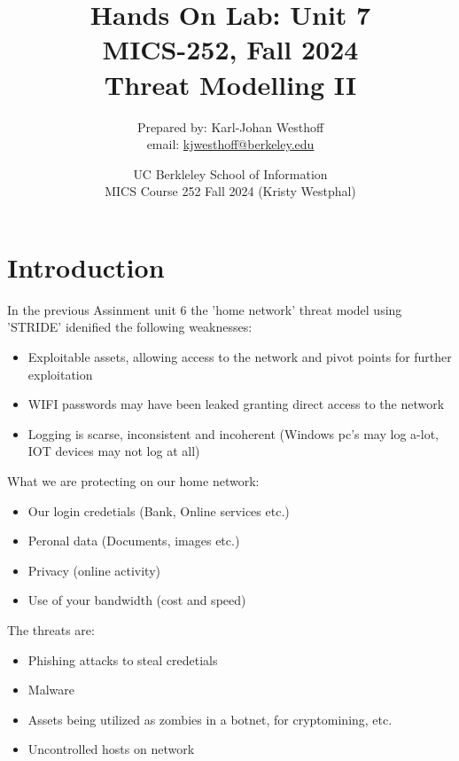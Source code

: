 \documentclass[
	letterpaper, %
	10pt, %
	unnumberedsections, %
	twoside, %
]{APAAssignment}
\title{Hands On Lab: Unit 7 \\ MICS-252, Fall 2024 \\ Threat Modelling II} %
\date{UC Berkleley School of Information \\
MICS Course 252 Fall 2024 (Kristy Westphal)
}
\author{
	Prepared by: Karl-Johan Westhoff \\
	email: \href{mailto:kjwesthoff@berkeley.edu}{kjwesthoff@berkeley.edu}
}
\begin{document}
\onecolumn
\maketitle %



\section{Introduction}
In the previous Assinment unit 6 \cite{Assingnment6} the 'home network' threat model using 'STRIDE' idenified the following weaknesses:

\begin{spacing}{1}
	\begin{itemize}
		\item Exploitable assets, allowing access to the network and pivot points for further exploitation
		\item WIFI passwords may have been leaked granting direct access to the network
		\item Logging is scarse, inconsistent and incoherent (Windows pc's may log a-lot, IOT devices may not log at all)
	\end{itemize}
\end{spacing}


What we are protecting on our home network:
\begin{spacing}{1}
	\begin{itemize}
		\item Our login credetials (Bank, Online services etc.)
		\item Peronal data (Documents, images etc.)
		\item Privacy (online activity)
		\item Use of your bandwidth (cost and speed)
	\end{itemize}
\end{spacing}

The threats are:

\begin{spacing}{1}
	\begin{itemize}
		\item Phishing attacks to steal credetials
		\item Malware
		\item Assets being utilized as zombies in a botnet, for cryptomining, etc.
		\item Uncontrolled hosts on network
	\end{itemize}
\end{spacing}
\end{document}
